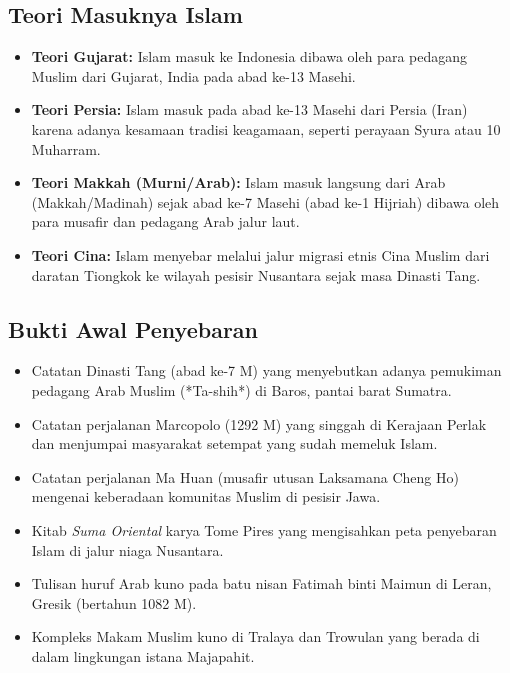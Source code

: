 \documentclass[12pt, a4paper]{article}
\begin{document}
\subsection{Teori Masuknya Islam}
\begin{itemize}
	\item \textbf{Teori Gujarat:} Islam masuk ke Indonesia dibawa oleh para pedagang Muslim dari Gujarat, India pada abad ke-13 Masehi.
	\item \textbf{Teori Persia:} Islam masuk pada abad ke-13 Masehi dari Persia (Iran) karena adanya kesamaan tradisi keagamaan, seperti perayaan Syura atau 10 Muharram.
	\item \textbf{Teori Makkah (Murni/Arab):} Islam masuk langsung dari Arab (Makkah/Madinah) sejak abad ke-7 Masehi (abad ke-1 Hijriah) dibawa oleh para musafir dan pedagang Arab jalur laut.
	\item \textbf{Teori Cina:} Islam menyebar melalui jalur migrasi etnis Cina Muslim dari daratan Tiongkok ke wilayah pesisir Nusantara sejak masa Dinasti Tang.
\end{itemize}

\subsection{Bukti Awal Penyebaran}
\begin{itemize}
	\item Catatan Dinasti Tang (abad ke-7 M) yang menyebutkan adanya pemukiman pedagang Arab Muslim (*Ta-shih*) di Baros, pantai barat Sumatra.
	\item Catatan perjalanan Marcopolo (1292 M) yang singgah di Kerajaan Perlak dan menjumpai masyarakat setempat yang sudah memeluk Islam.
	\item Catatan perjalanan Ma Huan (musafir utusan Laksamana Cheng Ho) mengenai keberadaan komunitas Muslim di pesisir Jawa.
	\item Kitab \textit{Suma Oriental} karya Tome Pires yang mengisahkan peta penyebaran Islam di jalur niaga Nusantara.
	\item Tulisan huruf Arab kuno pada batu nisan Fatimah binti Maimun di Leran, Gresik (bertahun 1082 M).
	\item Kompleks Makam Muslim kuno di Tralaya dan Trowulan yang berada di dalam lingkungan istana Majapahit.
\end{itemize}
\end{document}

